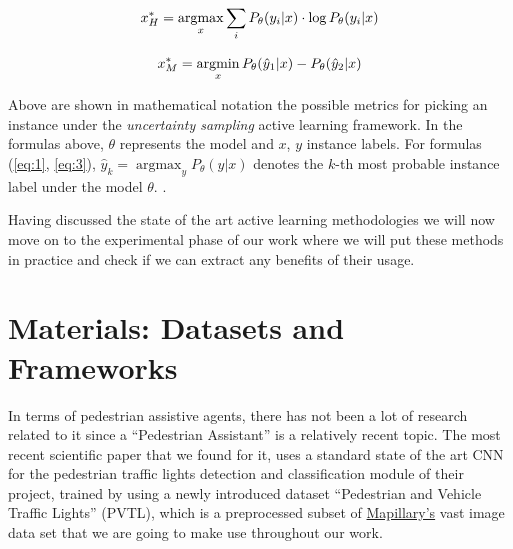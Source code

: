 \documentclass[journal, a4paper]{IEEEtran}
\begin{document}
\begin{equation}
    \label{eq:2}
    \large{x^*_{H} = \operatorname*{argmax}_x 
                   \sum_{i}{P_{\theta}(y_{i}|x) 
                   \cdot 
                   \log{P_{\theta}(y_{i}|x)}}}
\end{equation}

\begin{equation}
    \label{eq:3}
    \large{x^*_{M} = \operatorname*{argmin}_x 
                    P_{\theta}(\hat{y}_{1}|x) 
                    - P_{\theta}(\hat{y}_{2}|x)}
\end{equation}

Above are shown in mathematical notation the possible metrics for picking an instance under the 
\textit{uncertainty sampling} active learning framework. In the formulas above, $\theta$ represents 
the model and $x$, $y$ instance labels. For formulas (\ref{eq:1}, \ref{eq:3}),
$\hat{y}_{k}=\operatorname*{argmax}_y P_{\theta}(y|x)$ denotes the $k$-th most probable 
instance label under the model $\theta$. \cite{settles.tr09}.

Having discussed the state of the art active learning methodologies we will now move on to the
experimental phase of our work where we will put these methods in practice and check if we can 
extract any benefits of their usage.

\section{Materials: Datasets and Frameworks}

In terms of pedestrian assistive agents, there has not been a lot of research 
related to it since a ``Pedestrian Assistant'' is a relatively recent topic. 
The most recent scientific paper that we found for it, uses a standard 
state of the art CNN for the pedestrian traffic lights detection and 
classification module of their project, trained by using a newly introduced 
dataset “Pedestrian and Vehicle Traffic Lights” (PVTL), \cite{PVTL} which is a 
preprocessed subset of \href{https://www.mapillary.com/}{Mapillary’s} vast image data 
set that we are going to make use throughout our work.
\end{document}
